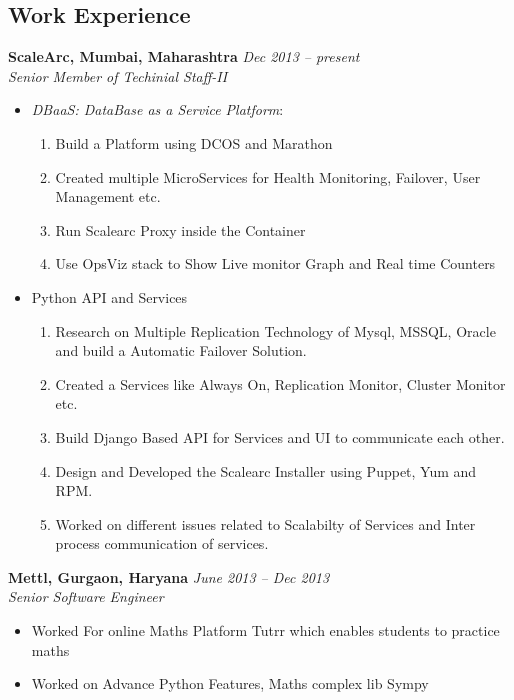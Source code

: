 \documentclass[margin,line]{resume}
\begin{document}
\begin{resume}
    \section{\mysidestyle Work Experience}

    \textbf{ScaleArc, Mumbai, Maharashtra }\hfill \textsl{Dec 2013 -- present}\vspace{0mm}\\\vspace{0mm}%
    \textsl{Senior Member of Techinial Staff-II}      \begin{itemize}
    \item \textsl{DBaaS: DataBase as a Service Platform}: 
    \begin{enumerate}
    \item Build a Platform using DCOS and Marathon
    \item Created multiple MicroServices for Health Monitoring, Failover, User Management etc.
    \item Run Scalearc Proxy inside the Container
    \item Use OpsViz stack to Show Live monitor Graph and Real time Counters
    \end{enumerate}
    
    \item Python API and Services
    \begin{enumerate}
    \item Research on Multiple Replication Technology of Mysql, MSSQL, Oracle and build a Automatic Failover Solution.  
    \item Created a Services like Always On, Replication Monitor, Cluster Monitor etc.
    \item Build Django Based API for Services and UI to communicate each other.
    \item Design and Developed the Scalearc Installer using Puppet, Yum and RPM.
    \item Worked on different issues related to Scalabilty of Services and Inter process communication of services.
    \end{enumerate}
    \end{itemize}
      
    \textbf{Mettl, Gurgaon, Haryana }\hfill \textsl{June 2013 -- Dec 2013}\vspace{0mm}\\\vspace{0mm}%
    \textsl{Senior Software Engineer}   
    \begin{itemize}
    \item Worked For online Maths Platform Tutrr which enables students to practice maths
    \item Worked on Advance Python Features, Maths complex lib Sympy
    \end{itemize}
    

\end{resume}
\end{document}
